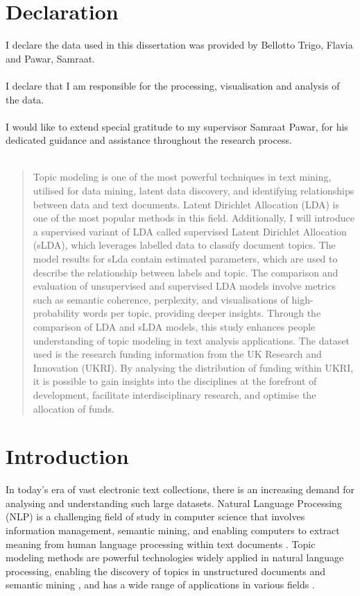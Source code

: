 \documentclass[12pt,twoside]{article}
\begin{document}

\newpage
\thispagestyle{empty} 

\section*{Declaration}
I declare the data used in this dissertation was provided by Bellotto Trigo, Flavia and Pawar, Samraat. \\\\
I declare that I am responsible for the processing, visualisation and analysis of the data. \\\\
I would like to extend special gratitude to my supervisor Samraat Pawar, for his dedicated guidance and assistance throughout the research process.
\\\\


\tableofcontents

\newpage
\begin{abstract}
Topic modeling is one of the most powerful techniques in text mining, utilised for data mining, latent data discovery, and identifying relationships between data and text documents. Latent Dirichlet Allocation (LDA) is one of the most popular methods in this field. Additionally, I will introduce a supervised variant of LDA called supervised Latent Dirichlet Allocation (sLDA), which leverages labelled data to classify document topics. The model results for sLda contain estimated parameters, which are used to describe the relationship between labels and topic. The comparison and evaluation of unsupervised and supervised LDA models involve metrics such as semantic coherence, perplexity, and visualisations of high-probability words per topic, providing deeper insights. Through the comparison of LDA and sLDA models, this study enhances people understanding of topic modeling in text analysis applications. The dataset used is the research funding information from the UK Research and Innovation (UKRI). By analysing the distribution of funding within UKRI, it is possible to gain insights into the disciplines at the forefront of development, facilitate interdisciplinary research, and optimise the allocation of funds.

\end{abstract}
\section{Introduction}
In today's era of vast electronic text collections, there is an increasing demand for analysing and understanding such large datasets. Natural Language Processing (NLP) is a challenging field of study in computer science that involves information management, semantic mining, and enabling computers to extract meaning from human language processing within text documents \cite{Jelodar:2019aa}. Topic modeling methods are powerful technologies widely applied in natural language processing, enabling the discovery of topics in unstructured documents and semantic mining \cite{blei2003latent}, and has a wide range of applications in various fields \cite{Varghese:2018aa} \cite{Papadatos:2014aa}.\\\\
\end{document}
